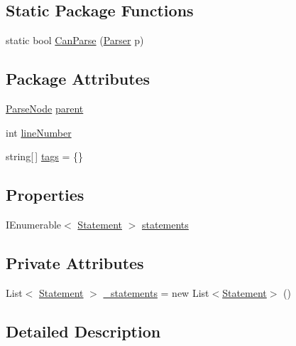 \subsection*{Static Package Functions}
\begin{DoxyCompactItemize}
\item 
static bool \hyperlink{a00024_a7fa97243e2a807c2255988547d31cac7}{Can\-Parse} (\hyperlink{a00123}{Parser} p)
\end{DoxyCompactItemize}
\subsection*{Package Attributes}
\begin{DoxyCompactItemize}
\item 
\hyperlink{a00122}{Parse\-Node} \hyperlink{a00122_af313a82103fcc2ff5a177dbb06b92f7b}{parent}
\item 
int \hyperlink{a00122_a18b493382de0fde5b4299c1bd2250075}{line\-Number}
\item 
string\mbox{[}$\,$\mbox{]} \hyperlink{a00122_a58b3a15788fd2d4127d73619dc6d04ae}{tags} = \{\}
\end{DoxyCompactItemize}
\subsection*{Properties}
\begin{DoxyCompactItemize}
\item 
I\-Enumerable$<$ \hyperlink{a00142}{Statement} $>$ \hyperlink{a00024_a42e3d555bbd5ecbdf61c45ad715be7e1}{statements}
\end{DoxyCompactItemize}
\subsection*{Private Attributes}
\begin{DoxyCompactItemize}
\item 
List$<$ \hyperlink{a00142}{Statement} $>$ \hyperlink{a00024_ad79f9582e55ec75b68fd72ffcae0f41b}{\-\_\-statements} = new List$<$\hyperlink{a00142}{Statement}$>$ ()
\end{DoxyCompactItemize}


\subsection{Detailed Description}


